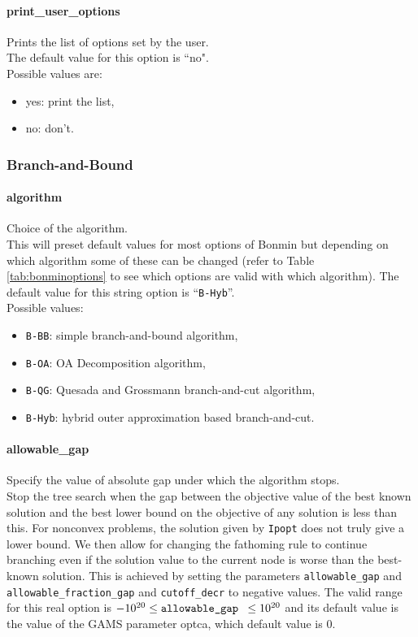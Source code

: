 \paragraph{print\_user\_options} Prints the list of options set by the user.\\
The default value for this option is ``no".\\
Possible values are:
\begin{itemize}
\item yes: print the list,
\item no: don't.
\end{itemize}

\subsubsection{Branch-and-Bound}

\paragraph{algorithm} Choice of the algorithm.\\
 This will preset default values for most options of Bonmin but depending on which algorithm some of these can be changed (refer to Table \ref{tab:bonminoptions} to see which options are valid with which algorithm).
  The default value for this string option is ``{\tt B-Hyb}''.\\
Possible values:
\begin{itemize}
   \item {\tt B-BB}: simple branch-and-bound algorithm,
   \item {\tt B-OA}: OA Decomposition algorithm,
   \item {\tt B-QG}: Quesada and Grossmann branch-and-cut algorithm,
   \item {\tt B-Hyb}: hybrid outer approximation based branch-and-cut.
\end{itemize}


\paragraph{allowable\_gap} Specify the value of absolute gap under which the algorithm stops.\\
 Stop the tree search when the gap between the objective value of the best known solution and the best lower bound on the objective of any solution is less than this.
For nonconvex problems, the solution given by {\tt Ipopt} does not truly give a lower bound. We then allow for
changing the fathoming rule to continue branching even if the solution value to the current node is worse
than the best-known solution.
This is achieved by setting the parameters {\tt allowable\_gap} and {\tt allowable\_fraction\_gap} and {\tt cutoff\_decr} to negative values.
The valid range for this real option is $-10^{20} \le \hbox{\tt allowable\_gap } \le 10^{20}$ and its default value is the value of the GAMS parameter optca, which default value is $0$.

